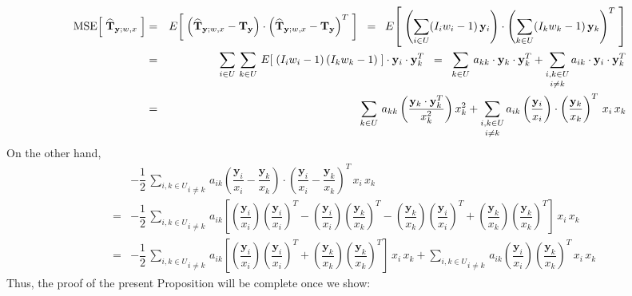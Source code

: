\documentclass{article}
\begin{document}
\proof
\begin{eqnarray*}
\textnormal{MSE}\!\left[\;\widehat{\mathbf{T}}_{\mathbf{y};w,x}\;\right]
&=& E\!\left[\;\left(\widehat{\mathbf{T}}_{\mathbf{y};w,x} - \mathbf{T}_{\mathbf{y}}\right)\cdot\left(\widehat{\mathbf{T}}_{\mathbf{y};w,x} - \mathbf{T}_{\mathbf{y}}\right)^{T}\;\right]
\;\;=\;\; E\!\left[\;\left(\sum_{i\in U}(I_{i}w_{i}-1)\,\mathbf{y}_{i}\right)\cdot\left(\sum_{k\in U}(I_{k}w_{k}-1)\,\mathbf{y}_{k}\right)^{T}\;\right] \\
&=& \sum_{i\in U}\,\sum_{k\in U}\,E\!\left[\;\left(I_{i}w_{i}-1\right)\left(I_{k}w_{k}-1\right)\;\right]\cdot\mathbf{y}_{i}\cdot\mathbf{y}_{k}^{T}
\;\;=\;\; \sum_{k \in U}\,a_{kk}\cdot\mathbf{y}_{k}\cdot\mathbf{y}_{k}^{T} + \underset{i\neq k}{\sum_{i,k\in U}}\,a_{ik}\cdot\mathbf{y}_{i}\cdot\mathbf{y}_{k}^{T} \\
&=& \sum_{k \in U}\,a_{kk}\left(\dfrac{\mathbf{y}_{k}\cdot\mathbf{y}_{k}^{T}}{x_{k}^{2}}\right)x_{k}^{2}
+ \underset{i\neq k}{\sum_{i,k\in U}}\,a_{ik}\left(\dfrac{\mathbf{y}_{i}}{x_{i}}\right)\cdot\left(\dfrac{\mathbf{y}_{k}}{x_{k}}\right)^{T}\,x_{i}\,x_{k}
\end{eqnarray*}
On the other hand,
\begin{eqnarray*}
&&   - \dfrac{1}{2}\,\underset{i \neq k}{\sum_{i,k\in U}}\,a_{ik}
\left(\dfrac{\mathbf{y}_{i}}{x_{i}} - \dfrac{\mathbf{y}_{k}}{x_{k}}\right)\cdot\left(\dfrac{\mathbf{y}_{i}}{x_{i}} - \dfrac{\mathbf{y}_{k}}{x_{k}}\right)^{T}
\,x_{i}\,x_{k} \\
&=& - \dfrac{1}{2}\,\underset{i \neq k}{\sum_{i,k\in U}}\,a_{ik}
\left[\left(\dfrac{\mathbf{y}_{i}}{x_{i}}\right)\left(\dfrac{\mathbf{y}_{i}}{x_{i}}\right)^{T}
- \left(\dfrac{\mathbf{y}_{i}}{x_{i}}\right)\left(\dfrac{\mathbf{y}_{k}}{x_{k}}\right)^{T}
- \left(\dfrac{\mathbf{y}_{k}}{x_{k}}\right)\left(\dfrac{\mathbf{y}_{i}}{x_{i}}\right)^{T}
+ \left(\dfrac{\mathbf{y}_{k}}{x_{k}}\right)\left(\dfrac{\mathbf{y}_{k}}{x_{k}}\right)^{T}\right]\,x_{i}\,x_{k} \\
&=& - \dfrac{1}{2}\,\underset{i \neq k}{\sum_{i,k\in U}}\,a_{ik}\left[
    \left(\dfrac{\mathbf{y}_{i}}{x_{i}}\right)\left(\dfrac{\mathbf{y}_{i}}{x_{i}}\right)^{T}
+ \left(\dfrac{\mathbf{y}_{k}}{x_{k}}\right)\left(\dfrac{\mathbf{y}_{k}}{x_{k}}\right)^{T}
\right]\,x_{i}\,x_{k}
+ \underset{i \neq k}{\sum_{i,k\in U}}\,a_{ik}\left(\dfrac{\mathbf{y}_{i}}{x_{i}}\right)\left(\dfrac{\mathbf{y}_{k}}{x_{k}}\right)^{T}\,x_{i}\,x_{k}
\end{eqnarray*}
Thus, the proof of the present Proposition will be complete once we show:
\end{document}
